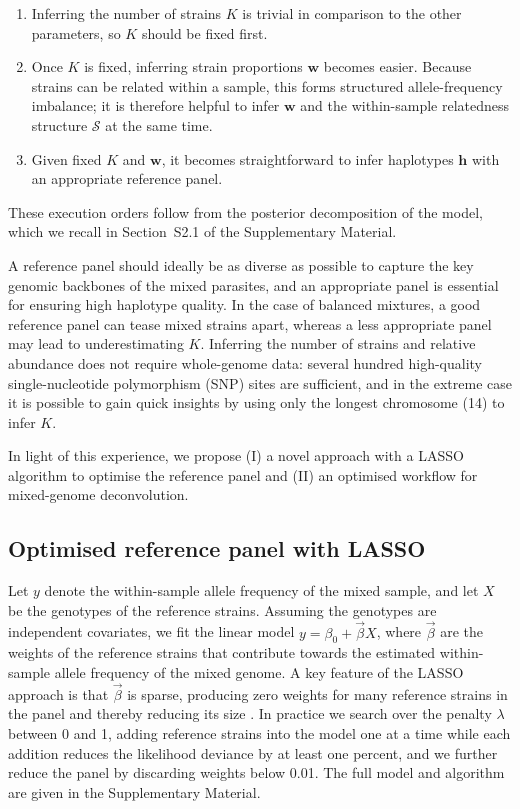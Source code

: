 \documentclass{bioinfo}
\begin{document}
\begin{enumerate}
  \item Inferring the number of strains $K$ is trivial in comparison to the other parameters, so $K$ should be fixed first.
  \item Once $K$ is fixed, inferring strain proportions $\mathbf{w}$ becomes easier. Because strains can be related within a sample, this forms structured allele-frequency imbalance; it is therefore helpful to infer $\mathbf{w}$ and the within-sample relatedness structure $\mathcal{S}$ at the same time.
  \item Given fixed $K$ and $\mathbf{w}$, it becomes straightforward to infer haplotypes $\mathbf{h}$ with an appropriate reference panel.
\end{enumerate}

These execution orders follow from the posterior decomposition of the model, which we recall in Section~S2.1 of the Supplementary Material.

A reference panel should ideally be as diverse as possible to capture the key genomic backbones of the mixed parasites, and an appropriate panel is essential for ensuring high haplotype quality. In the case of balanced mixtures, a good reference panel can tease mixed strains apart, whereas a less appropriate panel may lead to underestimating $K$. Inferring the number of strains and relative abundance does not require whole-genome data: several hundred high-quality single-nucleotide polymorphism (SNP) sites are sufficient, and in the extreme case it is possible to gain quick insights by using only the longest chromosome (14) to infer $K$.

In light of this experience, we propose (I) a novel approach with a LASSO algorithm to optimise the reference panel and (II) an optimised workflow for mixed-genome deconvolution.

\subsection{Optimised reference panel with LASSO}

Let $y$ denote the within-sample allele frequency of the mixed sample, and let $X$ be the genotypes of the reference strains. Assuming the genotypes are independent covariates, we fit the linear model $y = \beta_0 + \overrightarrow{\beta} X$, where $\overrightarrow{\beta}$ are the weights of the reference strains that contribute towards the estimated within-sample allele frequency of the mixed genome. A key feature of the LASSO approach is that $\overrightarrow{\beta}$ is sparse, producing zero weights for many reference strains in the panel and thereby reducing its size \citep{Friedman2010}. In practice we search over the penalty $\lambda$ between 0 and 1, adding reference strains into the model one at a time while each addition reduces the likelihood deviance by at least one percent, and we further reduce the panel by discarding weights below 0.01. The full model and algorithm are given in the Supplementary Material.
\end{document}
